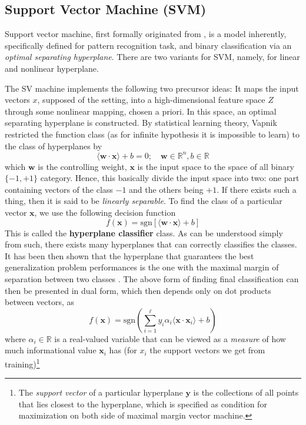 \documentclass{article}
\begin{document}
\subsection{Support Vector Machine (SVM)}

Support vector machine, first formally originated from \cite{Vapnik1999-VAPTNO}, is a model inherently, specifically defined for pattern recognition task, and binary classification via an \textit{optimal separating hyperplane}. There are two variants for SVM, namely, for linear and nonlinear hyperplane. 

The SV machine implements the following two precursor ideas: It maps the input vectors $x$, supposed of the setting, into a high-dimensional feature space $Z$ through some nonlinear mapping, chosen a priori. In this space, an optimal separating hyperplane is constructed. By statistical learning theory, Vapnik restricted the function class (as for infinite hypothesis it is impossible to learn) to the class of hyperplanes by 
\begin{equation}
    \langle \mathbf{w}\cdot \mathbf{x} \rangle + b = 0 ; \quad \mathbf{w}\in \mathbb{R}^{n} , b\in \mathbb{R}
\end{equation}
which $\mathbf{w}$ is the controlling weight, $\mathbf{x}$ is the input space to the space of all binary $\{-1,+1\}$ category. Hence, this basically divide the input space into two: one part containing vectors of the class $-1$ and the others being $+1$. If there exists such a thing, then it is said to be \textit{linearly separable}. To find the class of a particular vector $\mathbf{x}$, we use the following decision function 
\begin{equation}
    f(\mathbf{x}) = \mathrm{sgn}[\langle \mathbf{w}\cdot \mathbf{x}\rangle+ b]
\end{equation}
This is called the \textbf{hyperplane classifier} class. As can be understood simply from such, there exists many hyperplanes that can correctly classifies the classes. It has been then shown that the hyperplane that guarantees the best generalization problem performances is the one with the maximal margin of separation between two classes \cite{Cristianini2000AnIT}. The above form of finding final classification can then be presented in dual form, which then depends only on dot products between vectors, as 
\begin{equation}
    f(\mathbf{x}) = \mathrm{sgn}\left(\sum^{\ell}_{i=1} y_{i}\alpha_{i} \langle \mathbf{x}\cdot \mathbf{x}_{i} \rangle+ b\right)
\end{equation} where $\alpha_{i}\in \mathbb{R}$ is a real-valued variable that can be viewed as a \textit{measure} of how much informational value $\mathbf{x}_{i}$ has (for $x_{i}$ the support vectors we get from training)\footnote{The \textit{support vector} of a particular hyperplane $\mathbf{y}$ is the collections of all points that lies closest to the hyperplane, which is specified as condition for maximization on both side of maximal margin vector machine.}
\end{document}
